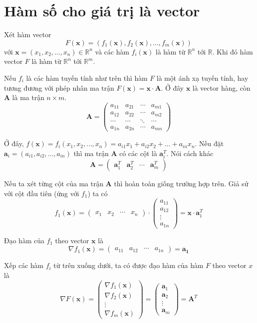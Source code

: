 \documentclass{mynotes}
\newcommand{\RR}{\mathbb{R}}
\begin{document}
\section*{Hàm số cho giá trị là vector}

Xét hàm vector \[F(\bm{x}) = (f_1(\bm{x}), f_2(\bm{x}), \ldots, f_m(\bm{x}))\] với $\bm{x} = (x_1, x_2, \ldots, x_n) \in \RR^n$ và các hàm $f_i (\bm{x})$ là hàm từ $\RR^n$ tới $\RR$. Khi đó hàm vector $F$ là hàm từ $\RR^n$ tới $\RR^m$.

Nếu $f_i$ là các hàm tuyến tính như trên thì hàm $F$ là một ánh xạ tuyến tính, hay tương đương với phép nhân ma trận $F(\bm{x}) = \bm{x} \cdot \bm{A}$. Ở đây $\bm{x}$ là vector hàng, còn $\bm{A}$ là ma trận $n \times m$. \[ \bm{A} = \begin{pmatrix}
    a_{11} & a_{21} & \cdots & a_{m1} \\ a_{12} & a_{22} & \cdots & a_{m2} \\ \cdots & \cdots & \ddots & \cdots \\ a_{1n} & a_{2n} & \cdots & a_{mn}
\end{pmatrix}\]

Ở đây, $f(\bm{x}) = f_i(x_1, x_2, \ldots, x_n) = a_{i1} x_1 + a_{i2} x_2 + \ldots + a_{in} x_n$. Nếu đặt $\bm{a}_i = (a_{i1}, a_{i2}, \ldots, a_{in})$ thì ma trận $\bm{A}$ có các cột là $\bm{a}_i^T$. Nói cách khác \[\bm{A} = \begin{pmatrix}
    \bm{a}_1^T & \bm{a}_2^T & \cdots & \bm{a}_m^T
\end{pmatrix}\]

Nếu ta xét từng cột của ma trận $\bm{A}$ thì hoàn toàn giống trường hợp trên. Giả sử với cột đầu tiên (ứng với $f_1$) ta có \[ f_1 (\bm{x}) = \begin{pmatrix}
    x_1 & x_2 & \cdots & x_n
\end{pmatrix} \cdot \begin{pmatrix}
    a_{11} \\ a_{12} \\ \vdots \\ a_{1n}\end{pmatrix} = \bm{x} \cdot \bm{a}_1^T \]

Đạo hàm của $f_1$ theo vector $\bm{x}$ là \[\nabla f_1 (\bm{x}) = \begin{pmatrix}
    a_{11} & a_{12} & \cdots & a_{1n} 
\end{pmatrix} = \bm{a_1}\]

Xếp các hàm $f_i$ từ trên xuống dưới, ta có được đạo hàm của hàm $F$ theo vector $x$ là \begin{equation}
    \nabla F(\bm{x}) = \begin{pmatrix}
        \nabla f_1 (\bm{x}) \\ \nabla f_2 (\bm{x}) \\ \vdots \\ \nabla f_m(\bm{x})
    \end{pmatrix}  = \begin{pmatrix}
    \bm{a}_1 \\ \bm{a}_2 \\ \vdots \\ \bm{a}_m
    \end{pmatrix} = \bm{A}^T
\end{equation}
\end{document}
